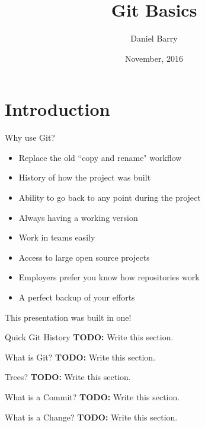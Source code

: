 \documentclass{beamer}
\title{Git Basics}
\date{November, 2016}
\author{Daniel Barry}
\institute{University of Hertfordshire}
\begin{document}
  \maketitle
  \section{Introduction}
  \begin{frame}{Why use Git?}
    \begin{itemize}
      \item Replace the old ``copy and rename" workflow
      \item History of how the project was built
      \item Ability to go back to any point during the project
      \item Always having a working version
      \item Work in teams easily
      \item Access to large open source projects
      \item Employers prefer you know how repositories work
      \item A perfect backup of your efforts
    \end{itemize}
    This presentation was built in one!
  \end{frame}
  \begin{frame}{Quick Git History}
    \textbf{TODO:} Write this section.
  \end{frame}
  \begin{frame}{What is Git?}
    \textbf{TODO:} Write this section.
  \end{frame}
  \begin{frame}{Trees?}
    \textbf{TODO:} Write this section.
  \end{frame}
  \begin{frame}{What is a Commit?}
    \textbf{TODO:} Write this section.
  \end{frame}
  \begin{frame}{What is a Change?}
    \textbf{TODO:} Write this section.
  \end{frame}
\end{document}
